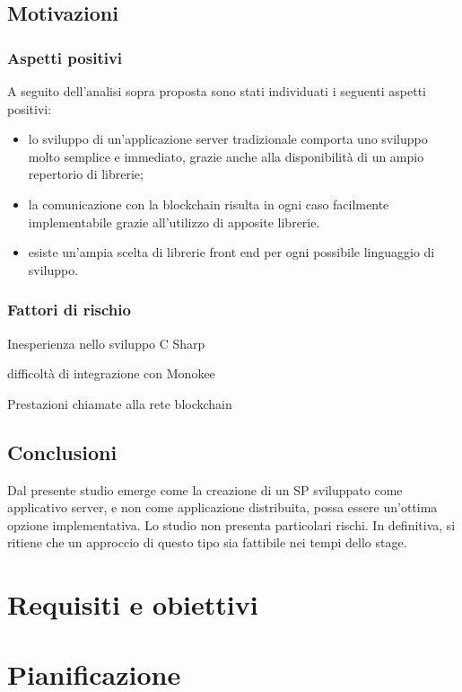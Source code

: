 \subsection{Motivazioni}
\subsubsection{Aspetti positivi}
A seguito dell’analisi sopra proposta sono stati individuati i seguenti aspetti positivi:
\begin{itemize}
    \item lo sviluppo di un’applicazione server tradizionale comporta uno sviluppo molto semplice e immediato, grazie anche alla disponibilità di un ampio repertorio di librerie;
    \item la comunicazione con la blockchain risulta in ogni caso facilmente implementabile grazie all’utilizzo di apposite librerie.
    \item esiste un’ampia scelta di librerie front end per ogni possibile linguaggio di sviluppo.
\end{itemize}
    
\subsubsection{Fattori di rischio}
\begin{risk}{Inesperienza nello sviluppo C Sharp}
    \label{risk:centralization-vision-from-user} 
\end{risk}
\begin{risk}{difficoltà di integrazione con Monokee}
    \label{risk:centralization-vision-from-user} 
\end{risk}
\begin{risk}{Prestazioni chiamate alla rete blockchain}
    \label{risk:centralization-vision-from-user} 
\end{risk}
\subsection{Conclusioni}
Dal presente studio emerge come la creazione di un SP sviluppato come applicativo server, e non come applicazione distribuita, possa essere un’ottima opzione implementativa. Lo studio non presenta particolari rischi. In definitiva, si ritiene che un approccio di questo tipo sia fattibile nei tempi dello stage.

\section{Requisiti e obiettivi}

\section{Pianificazione}